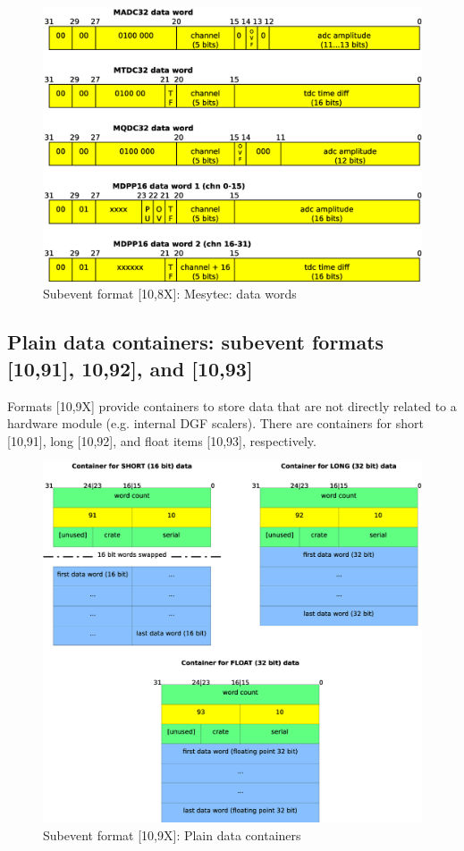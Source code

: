 \documentclass[10pt,a4paper]{article}
\begin{document}
\begin{figure}[H]
\centerline{\includegraphics[width=\linewidth]{MedSevt_Mesytec_3}}
\caption{Subevent format [10,8X]: Mesytec: data words}
\label{MedSevt_Mesytec_3}
\end{figure}
\newpage
\subsection{Plain data containers: subevent formats [10,91], 10,92], and [10,93]}
Formats [10,9X] provide containers to store data that are not directly related to a hardware module
(e.g. internal DGF scalers).
There are containers for short [10,91], long [10,92], and float items [10,93], respectively.
\begin{figure}[H]
\centerline{\includegraphics[width=.5\linewidth]{MedSevt_Data_X}}
\caption{Subevent format [10,9X]: Plain data containers}
\label{MedSevt_Data_X}
\end{figure}
\newpage
\end{document}
